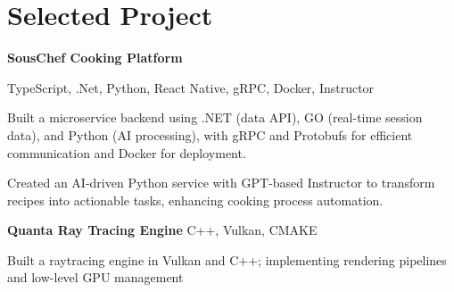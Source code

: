 
\newenvironment{twocolentry_proj}[2][]{
    \onecolentry
    \def\secondColumn{#2}
    \setcolumnwidth{\fill, 9 cm}
    \begin{paracol}{2}
}{
    \switchcolumn \raggedleft \secondColumn
    \end{paracol}
    \endonecolentry
} %

\vspace{5 pt - 0.4 cm}
\section{Selected Project}
\begin{twocolentry_proj}{
    \mbox{}%
}

\textbf{SousChef Cooking Platform}
\end{twocolentry_proj}

\vspace{0.10 cm}
\begin{onecolentry}
    \small TypeScript, .Net, Python, React Native, gRPC, Docker, Instructor 
    \begin{highlights}
        \item Built a microservice backend using .NET (data API), GO (real-time session data), and Python (AI processing), with gRPC and Protobufs for efficient communication and Docker for deployment.
        \item Created an AI-driven Python service with GPT-based Instructor to transform recipes into actionable tasks, enhancing cooking process automation.
    \end{highlights}
\end{onecolentry}


\vspace{0.10 cm}
\begin{twocolentry_proj}{
    \mbox{}%
}
\fontsize{11 pt}{11 pt}\textbf{Quanta Ray Tracing Engine} C++, Vulkan, CMAKE
\end{twocolentry_proj}
\begin{onecolentry}
    \begin{highlights}
        \item Built a raytracing engine in Vulkan and C++; implementing rendering pipelines and low-level GPU management
    \end{highlights}
\end{onecolentry}